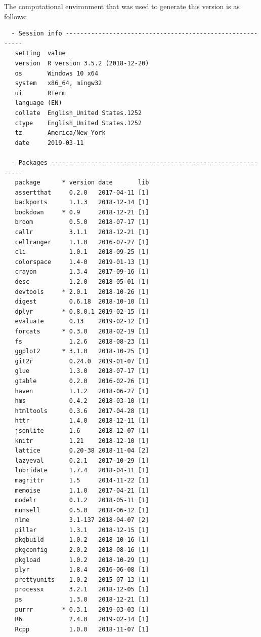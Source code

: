 \documentclass[ms]{uncgdissertationexp}
\theoremstyle{plain}
\theoremstyle{definition}
\theoremstyle{remark}
\begin{document}
  The computational environment that was used to generate this version is
  as follows:
  \begin{verbatim}
  - Session info ----------------------------------------------------------
   setting  value                       
   version  R version 3.5.2 (2018-12-20)
   os       Windows 10 x64              
   system   x86_64, mingw32             
   ui       RTerm                       
   language (EN)                        
   collate  English_United States.1252  
   ctype    English_United States.1252  
   tz       America/New_York            
   date     2019-03-11                  
  
  - Packages --------------------------------------------------------------
   package      * version date       lib
   assertthat     0.2.0   2017-04-11 [1]
   backports      1.1.3   2018-12-14 [1]
   bookdown     * 0.9     2018-12-21 [1]
   broom          0.5.0   2018-07-17 [1]
   callr          3.1.1   2018-12-21 [1]
   cellranger     1.1.0   2016-07-27 [1]
   cli            1.0.1   2018-09-25 [1]
   colorspace     1.4-0   2019-01-13 [1]
   crayon         1.3.4   2017-09-16 [1]
   desc           1.2.0   2018-05-01 [1]
   devtools     * 2.0.1   2018-10-26 [1]
   digest         0.6.18  2018-10-10 [1]
   dplyr        * 0.8.0.1 2019-02-15 [1]
   evaluate       0.13    2019-02-12 [1]
   forcats      * 0.3.0   2018-02-19 [1]
   fs             1.2.6   2018-08-23 [1]
   ggplot2      * 3.1.0   2018-10-25 [1]
   git2r          0.24.0  2019-01-07 [1]
   glue           1.3.0   2018-07-17 [1]
   gtable         0.2.0   2016-02-26 [1]
   haven          1.1.2   2018-06-27 [1]
   hms            0.4.2   2018-03-10 [1]
   htmltools      0.3.6   2017-04-28 [1]
   httr           1.4.0   2018-12-11 [1]
   jsonlite       1.6     2018-12-07 [1]
   knitr          1.21    2018-12-10 [1]
   lattice        0.20-38 2018-11-04 [2]
   lazyeval       0.2.1   2017-10-29 [1]
   lubridate      1.7.4   2018-04-11 [1]
   magrittr       1.5     2014-11-22 [1]
   memoise        1.1.0   2017-04-21 [1]
   modelr         0.1.2   2018-05-11 [1]
   munsell        0.5.0   2018-06-12 [1]
   nlme           3.1-137 2018-04-07 [2]
   pillar         1.3.1   2018-12-15 [1]
   pkgbuild       1.0.2   2018-10-16 [1]
   pkgconfig      2.0.2   2018-08-16 [1]
   pkgload        1.0.2   2018-10-29 [1]
   plyr           1.8.4   2016-06-08 [1]
   prettyunits    1.0.2   2015-07-13 [1]
   processx       3.2.1   2018-12-05 [1]
   ps             1.3.0   2018-12-21 [1]
   purrr        * 0.3.1   2019-03-03 [1]
   R6             2.4.0   2019-02-14 [1]
   Rcpp           1.0.0   2018-11-07 [1]

\end{verbatim}
\end{document}
